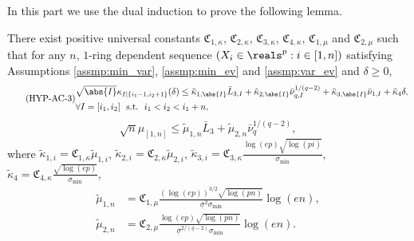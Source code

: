 \documentclass[aos]{imsart}
\begin{document}
\begin{appendix}
\medskip
{}  In this part we use the dual induction to prove the following lemma.
\begin{lemma}
    There exist positive universal constants $\mathfrak{C}_{1,\kappa}$, $\mathfrak{C}_{2,\kappa}$, $\mathfrak{C}_{3,\kappa}$, $\mathfrak{C}_{4,\kappa}$, $\mathfrak{C}_{1,\mu}$ and $\mathfrak{C}_{2,\mu}$ such that for any $n$, $1$-ring dependent sequence $(X_i \in \reals^p: i \in [1,n])$ satisfying Assumptions \eqref{assmp:min_var}, \eqref{assmp:min_ev} and \eqref{assmp:var_ev} and $\delta \geq 0$,
    \begin{equation} \label{eq:hypothesis_AC_3P} \tag{HYP-AC-3}
    \begin{aligned}
        & \sqrt{\abs{I}} \kappa_{I|\{i_1-1, i_2+1\}}(\delta)
        \leq 
        \tilde\kappa_{1,\abs{I}} \bar{L}_{3,I}
        + \tilde\kappa_{2,\abs{I}} \bar\nu_{q,I}^{1/(q-2)}
        + \tilde\kappa_{3,\abs{I}} \bar\nu_{1,I}
        + \tilde\kappa_{4} \delta, \\
        & \forall I = [i_1, i_2] ~~\text{s.t.}~~ i_1 < i_2 < i_1+n,
    \end{aligned}
    \end{equation}
    \begin{equation} \label{eq:hypothesis_BE_3P} \tag{HYP-BE-3}
        \sqrt{n} \mu_{[1,n]}
        \leq \tilde\mu_{1,n} \bar{L}_{3}
        + \tilde\mu_{2,n} \bar\nu_{q}^{1/(q-2)},
    \end{equation}
    where $\tilde\kappa_{1,i} = \mathfrak{C}_{1,\kappa} \tilde\mu_{1,i}$, 
    $\tilde\kappa_{2,i} = \mathfrak{C}_{2,\kappa} \tilde\mu_{2,i}$, 
    $\tilde\kappa_{3,i} = \mathfrak{C}_{3,\kappa} \frac{\log(ep)\sqrt{\log(pi)}}{\sigma_{\min}}$,
    $\tilde\kappa_{4} = \mathfrak{C}_{4,\kappa} \frac{\sqrt{\log(ep)}}{\sigma_{\min}}$,
    \begin{equation*}
    \begin{aligned}
        \tilde\mu_{1,n} 
        & = \mathfrak{C}_{1,\mu} \frac{(\log(ep))^{3/2}\sqrt{\log(pn)}}{\underline\sigma^2\sigma_{\min}} \log\left(e n\right), \\
        \tilde\mu_{2,n}
        & = \mathfrak{C}_{2,\mu} \frac{\log(ep)\sqrt{\log(pn)}}{\underline\sigma^{2/(q-2)} \sigma_{\min}} \log\left(e n\right).
    \end{aligned}
    \end{equation*}
\end{lemma}

\end{appendix}
\end{document}
